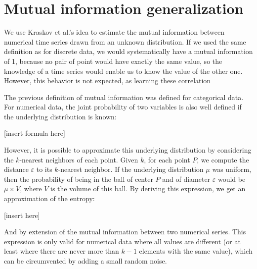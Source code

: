 \documentclass[12pt,a4paper]{article}
\begin{document}
\section{Mutual information generalization}\label{appendix}

We use Kraskov et al.'s idea \cite{estimating-mutual-information} to estimate the mutual information between numerical time series drawn from an unknown distribution. If we used the same definition as for discrete data, we would systematically have a mutual information of 1, because no pair of point would have exactly the same value, so the knowledge of a time series would enable us to know the value of the other one. However, this behavior is not expected, as learning these correlation 


The previous definition of mutual information was defined for categorical data. For numerical data, the joint probability of two variables is also well defined if the underlying distribution is known:

[insert formula here]

However, it is possible to approximate this underlying distribution by considering the $k$-nearest neighbors of each point. Given $k$, for each point $P$, we compute the distance $\varepsilon$ to its $k$-nearest neighbor. If the underlying distribution $\mu$ was uniform, then the probability of being in the ball of center $P$ and of diameter $\varepsilon$ would be $\mu \times V$, where $V$ is the volume of this ball. By deriving this expression, we get an approximation of the entropy:

[insert here]

And by extension of the mutual information between two numerical series. This expression is only valid for numerical data where all values are different (or at least where there are never more than $k-1$ elements with the same value), which can be circumvented by adding a small random noise.

\clearpage

\end{document}
